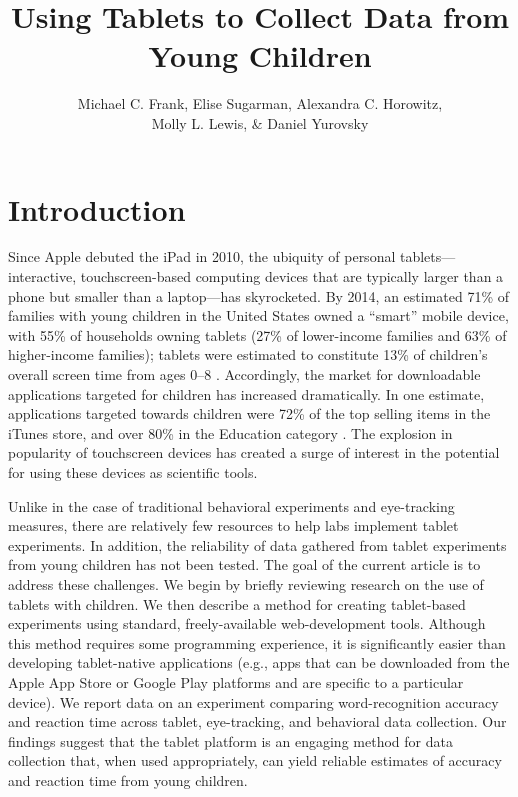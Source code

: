 \documentclass[man,noapacite]{apa2}
\title{Using Tablets to Collect Data from Young Children}
\author{Michael C. Frank, Elise Sugarman, Alexandra C. Horowitz, \\ Molly L. Lewis, \& Daniel Yurovsky}
\affiliation{Department of Psychology, Stanford University}
\begin{document}
\maketitle


\section{Introduction}

Since Apple debuted the iPad in 2010, the ubiquity of personal tablets---interactive, touchscreen-based computing devices that are typically larger than a phone but smaller than a laptop---has skyrocketed. By 2014, an estimated 71\% of families with young children in the United States owned a ``smart'' mobile device, with 55\% of households owning tablets (27\% of lower-income families and 63\% of higher-income families); tablets were estimated to constitute 13\% of children's overall screen time from ages 0--8 \cite{rideout2014}. Accordingly, the market for downloadable applications targeted for children has increased dramatically. In one estimate, applications targeted towards children were 72\% of the top selling items in the iTunes store, and over 80\% in the Education category \cite{shuler2012}. The explosion in popularity of touchscreen devices has created a surge of interest in the potential for using these devices as scientific tools. 

Unlike in the case of traditional behavioral experiments and eye-tracking measures, there are relatively few resources to help labs implement tablet experiments. In addition, the reliability of data gathered from tablet experiments from young children has not been tested. The goal of the current article is to address these challenges. We begin by briefly reviewing research on the use of tablets with children. We then describe a method for creating tablet-based experiments using standard, freely-available web-development tools. Although this method requires some programming experience, it is significantly easier than developing tablet-native applications (e.g., apps that can be downloaded from the Apple App Store or Google Play platforms and are specific to a particular device). We report data on an experiment comparing word-recognition accuracy and reaction time across tablet, eye-tracking, and behavioral data collection. Our findings suggest that the tablet platform is an engaging method for data collection that, when used appropriately, can yield reliable estimates of accuracy and reaction time from young children. 
\end{document}
